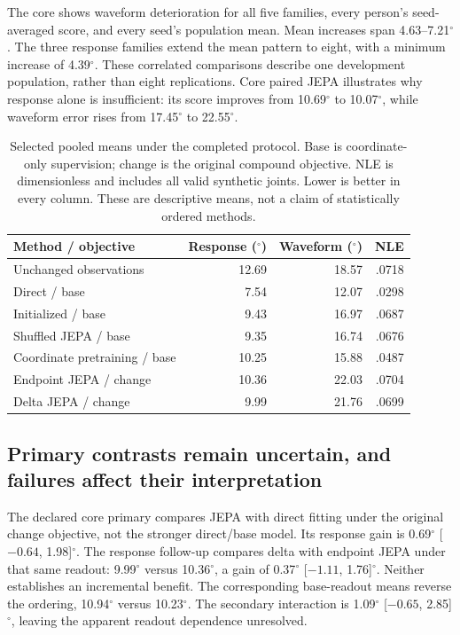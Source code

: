 \documentclass{article}
\newcommand{\degunit}{^{\circ}}
\begin{document}
The core shows waveform deterioration for all five families, every person's seed-averaged score, and every seed's population mean. Mean increases span 4.63--7.21$\degunit$. The three response families extend the mean pattern to eight, with a minimum increase of 4.39$\degunit$. These correlated comparisons describe one development population, rather than eight replications. Core paired JEPA illustrates why response alone is insufficient: its score improves from 10.69$\degunit$ to 10.07$\degunit$, while waveform error rises from 17.45$\degunit$ to 22.55$\degunit$.

\begin{table}[h]\centering\small
\caption{Selected pooled means under the completed protocol. Base is coordinate-only supervision; change is the original compound objective. NLE is dimensionless and includes all valid synthetic joints. Lower is better in every column. These are descriptive means, not a claim of statistically ordered methods.}
\label{tab:results}
\begin{tabular}{lrrr}\toprule
Method / objective & Response ($\degunit$)& Waveform ($\degunit$)& NLE\\\midrule
Unchanged observations &12.69&18.57&.0718\\
Direct / base &7.54&12.07&.0298\\
Initialized / base &9.43&16.97&.0687\\
Shuffled JEPA / base &9.35&16.74&.0676\\
Coordinate pretraining / base &10.25&15.88&.0487\\
Endpoint JEPA / change &10.36&22.03&.0704\\
Delta JEPA / change &9.99&21.76&.0699\\\bottomrule
\end{tabular}\end{table}

\clearpage
\subsection{Primary contrasts remain uncertain, and failures affect their interpretation}
The declared core primary compares JEPA with direct fitting under the original change objective, not the stronger direct/base model. Its response gain is 0.69$\degunit$ [${-0.64}$, 1.98]$\degunit$. The response follow-up compares delta with endpoint JEPA under that same readout: 9.99$\degunit$ versus 10.36$\degunit$, a gain of 0.37$\degunit$ [${-1.11}$, 1.76]$\degunit$. Neither establishes an incremental benefit. The corresponding base-readout means reverse the ordering, 10.94$\degunit$ versus 10.23$\degunit$. The secondary interaction is 1.09$\degunit$ [${-0.65}$, 2.85]$\degunit$, leaving the apparent readout dependence unresolved.
\end{document}
